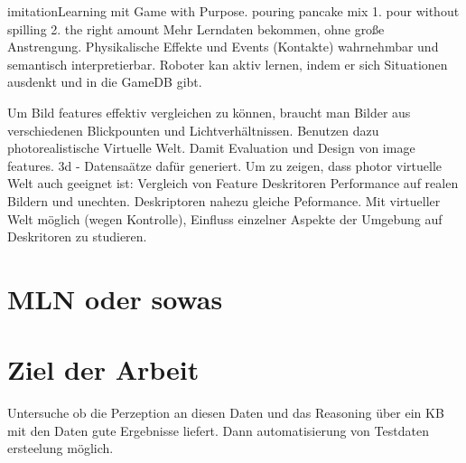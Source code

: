 \cite{imitationLearning2} \newline
imitationLearning mit Game with Purpose. \newline
pouring pancake mix 1. pour without spilling 2. the right amount \newline
Mehr Lerndaten bekommen, ohne große Anstrengung. Physikalische Effekte und Events (Kontakte) wahrnehmbar und semantisch interpretierbar. Roboter kan aktiv lernen, indem er sich Situationen ausdenkt und in die GameDB gibt. \par

\cite{kaneva} \newline
Um Bild features effektiv vergleichen zu können, braucht man Bilder aus verschiedenen Blickpounten und Lichtverhältnissen. Benutzen dazu photorealistische Virtuelle Welt. Damit Evaluation und Design von image features.  3d - Datensaätze dafür generiert. \newline
Um zu zeigen, dass photor virtuelle Welt auch geeignet ist: Vergleich von Feature Deskritoren Performance auf realen Bildern und unechten. Deskriptoren nahezu gleiche Peformance. \newline
Mit virtueller Welt möglich (wegen Kontrolle), Einfluss einzelner Aspekte der Umgebung auf Deskritoren zu studieren. \par 
 

\section{MLN oder sowas}

\section{Ziel der Arbeit}
\label{sec:goal}


Untersuche ob die Perzeption an diesen Daten und das Reasoning über ein KB mit den Daten gute Ergebnisse liefert. Dann automatisierung von Testdaten ersteelung möglich. 